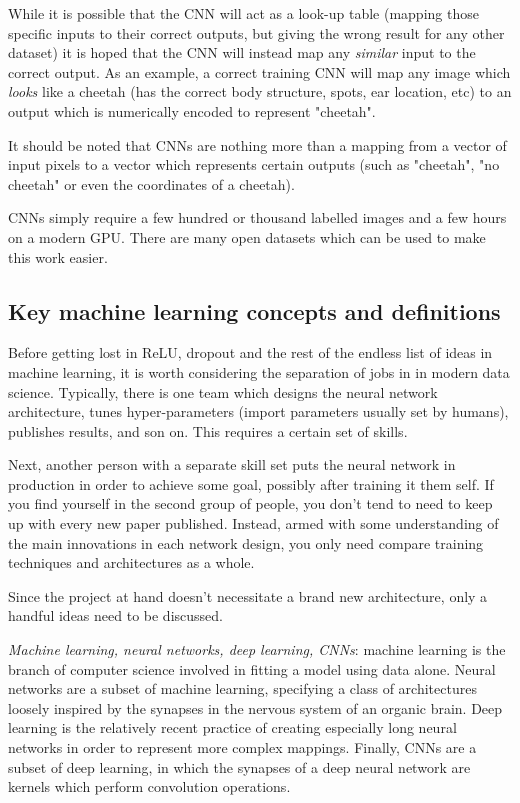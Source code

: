 While it is possible that the CNN will act as a look-up table (mapping those specific inputs to their correct outputs, but giving the wrong result for any other dataset) it is hoped that the CNN will instead map any \emph{similar} input to the correct output. As an example, a correct training CNN will map any image which \emph{looks} like a cheetah (has the correct body structure, spots, ear location, etc) to an output which is numerically encoded to represent "cheetah".

It should be noted that CNNs are nothing more than a mapping from a vector of input pixels to a vector which represents certain outputs (such as "cheetah", "no cheetah" or even the coordinates of a cheetah).

CNNs simply require a few hundred or thousand labelled images and a few hours on a modern GPU. There are many open datasets which can be used to make this work easier.

\subsection{Key machine learning concepts and definitions}
Before getting lost in ReLU, dropout and the rest of the endless list of ideas in machine learning, it is worth considering the separation of jobs in in modern data science. Typically, there is one team which designs the neural network architecture, tunes hyper-parameters (import parameters usually set by humans), publishes results, and son on. This requires a certain set of skills.

Next, another person with a separate skill set puts the neural network in production in order to achieve some goal, possibly after training it them self. If you find yourself in the second group of people, you don't tend to need to keep up with every new paper published. Instead, armed with some understanding of the main innovations in each network design, you only need compare training techniques and architectures as a whole.

Since the project at hand doesn't necessitate a brand new architecture, only a handful ideas need to be discussed.

\textit{Machine learning, neural networks, deep learning, CNNs}: machine learning is the branch of computer science involved in fitting a model using data alone. Neural networks are a subset of machine learning, specifying a class of architectures loosely inspired by the synapses in the nervous system of an organic brain. Deep learning is the relatively recent practice of creating especially long neural networks in order to represent more complex mappings. Finally, CNNs are a subset of deep learning, in which the synapses of a deep neural network are kernels which perform convolution operations.

